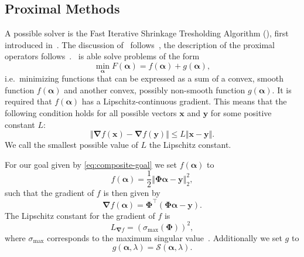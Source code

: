 \subsection{Proximal Methods}
A possible solver is the Fast Iterative Shrinkage Tresholding Algorithm (\fista), first introduced in~\cite{fista}.
The discussion of \fista\ follows~\cite{fista}, the description of
the proximal operators follows~\cite{proxsurvey}.
\fista\ is able solve problems of the form
\begin{equation}\label{eq:composite-goal}
\min_{\bm{\alpha}} F(\bm{\alpha}) = f(\bm{\alpha}) + g(\bm{\alpha}),
\end{equation}
i.e.~minimizing functions that can be expressed as a sum of a convex, smooth function \(f(\bm{\alpha})\) and another convex, possibly non-smooth function \(g(\bm{\alpha})\).
It is required that \(f(\bm{\alpha})\) has a Lipschitz-continuous gradient. 
This means that the following condition holds for all possible vectors \(\bm{x}\) and \(\bm{y}\) for some positive constant \(L\):
\begin{equation}   \label{eq:lipschitz}
 \Vert \bm{\nabla} f(\bm{x}) - \bm{\nabla} f(\bm{y}) \Vert \leq L \Vert \bm{x} - \bm{y} \Vert.
\end{equation}
We call the smallest possible value of \(L\) the Lipschitz constant.

For our goal given by \cref{eq:composite-goal} we set \(f(\bm{\alpha})\) to
\begin{equation*}
 f(\bm{\alpha}) = \frac{1}{2} \left\Vert  \bm{\Phi} \bm{\alpha} - \bm{y}   \right\Vert_2^2,
\end{equation*}
such that the gradient of \(f\) is then given by
\begin{equation*}
  \bm{\nabla} f(\bm{\alpha}) = \bm{\Phi}^\intercal \left(\bm{\Phi} \bm{\alpha} - \bm{y} \right).
\end{equation*}
The Lipschitz constant for the gradient of \(f\) is
\begin{equation}
  \label{eq:lipf}
  L_{\bm{\nabla} f} = {\left(\sigma_{\max} \left(\bm{\Phi}\right)\right)}^2,
\end{equation}
where \(\sigma_{\max} \) corresponds to the maximum singular value~\autocite{fista}.
Additionally we set \(g\) to
\begin{equation*}
  g(\bm{\alpha}, \lambda) = \mathcal{S} \left( \bm{\alpha}, \lambda \right).
\end{equation*}


